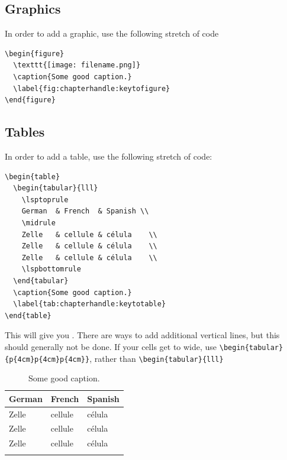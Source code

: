 \newpage
\subsection{Graphics}
In order to add a graphic, use the following stretch of code

\begin{verbatim}
\begin{figure}
  \texttt{[image: filename.png]}
  \caption{Some good caption.}
  \label{fig:chapterhandle:keytofigure}
\end{figure}
\end{verbatim}

\subsection{Tables}
In order to add a table, use the following stretch of code:

\begin{verbatim}
\begin{table} 
  \begin{tabular}{lll}
    \lsptoprule
    German  & French  & Spanish \\
    \midrule
    Zelle   & cellule & célula    \\
    Zelle   & cellule & célula    \\
    Zelle   & cellule & célula    \\
    \lspbottomrule
  \end{tabular}
  \caption{Some good caption.}
  \label{tab:chapterhandle:keytotable}
\end{table}
\end{verbatim}

This will give you  . There are ways to add additional vertical lines, but this should generally not be done. If your cells get to wide, use \verb+\begin{tabular}+ \verb+{p{4cm}p{4cm}p{4cm}}+, rather than \verb+\begin{tabular}{lll}+
\begin{table}[h]
  \begin{tabular}{lll}
    \lsptoprule
    German  & French  & Spanish \\
    \midrule
    Zelle   & cellule & célula    \\
    Zelle   & cellule & célula    \\
    Zelle   & cellule & célula    \\
    \lspbottomrule
  \end{tabular}
  \caption{Some good caption.}
  \label{tab:chapterhandle:keytotable}
\end{table}

